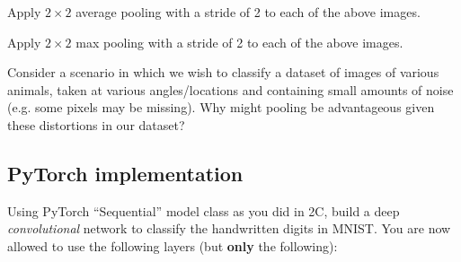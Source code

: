 Apply $2 \times 2$ average pooling with a stride of 2 to each of the above images.

\problem[3]

Apply $2 \times 2$ max pooling with a stride of 2 to each of the above images.

\problem[4]

Consider a scenario in which we wish to classify a dataset of images of various animals, taken at various angles/locations and containing small amounts of noise (e.g. some pixels may be missing). Why might pooling be advantageous given these distortions in our dataset?

\subsection{PyTorch implementation}
\problem[20]

Using PyTorch ``Sequential'' model class as you did in 2C, build a deep \emph{convolutional}
network to classify the handwritten digits in MNIST. You are now allowed to use
the following layers (but \textbf{only} the following):

